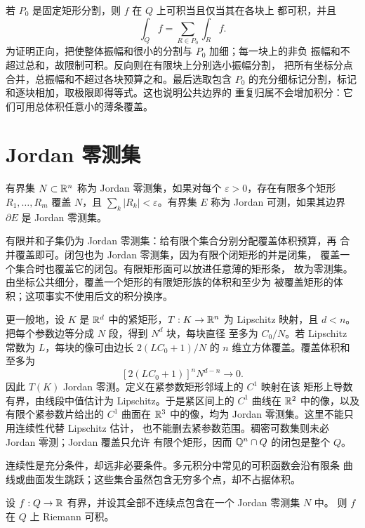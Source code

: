 若 $P_0$ 是固定矩形分割，则 $f$ 在 $Q$ 上可积当且仅当其在各块上
都可积，并且
\[
 \int_Q f=\sum_{R\in P_0}\int_R f.
\]
为证明正向，把使整体振幅和很小的分割与 $P_0$ 加细；每一块上的非负
振幅和不超过总和，故限制可积。反向则在有限块上分别选小振幅分割，
把所有坐标分点合并，总振幅和不超过各块预算之和。最后选取包含 $P_0$
的充分细标记分割，标记和逐块相加，取极限即得等式。这也说明公共边界的
重复归属不会增加积分：它们可用总体积任意小的薄条覆盖。

\section{Jordan 零测集}

\begin{definition}
有界集 $N\subset\mathbb{R}^n$ 称为 Jordan 零测集，如果对每个
$\varepsilon>0$，存在有限多个矩形 $R_1,\ldots,R_m$ 覆盖 $N$，且
$\sum_k|R_k|<\varepsilon$。有界集 $E$ 称为 Jordan 可测，如果其边界
$\partial E$ 是 Jordan 零测集。
\end{definition}

有限并和子集仍为 Jordan 零测集：给有限个集合分别分配覆盖体积预算，再
合并覆盖即可。闭包也为 Jordan 零测集，因为有限个闭矩形的并是闭集，
覆盖一个集合时也覆盖它的闭包。有限矩形面可以放进任意薄的矩形条，
故为零测集。由坐标公共细分，覆盖一个矩形的有限矩形族的体积和至少为
被覆盖矩形的体积；这项事实不使用后文的积分换序。

更一般地，设 $K$ 是 $\mathbb{R}^d$ 中的紧矩形，$T:K\to\mathbb{R}^n$ 为 Lipschitz
映射，且 $d<n$。把每个参数边等分成 $N$ 段，得到 $N^d$ 块，每块直径
至多为 $C_0/N$。若 Lipschitz 常数为 $L$，每块的像可由边长
$2(LC_0+1)/N$ 的 $n$ 维立方体覆盖。覆盖体积和至多为
\[
 [2(LC_0+1)]^n N^{d-n}\longrightarrow0.
\]
因此 $T(K)$ Jordan 零测。定义在紧参数矩形邻域上的 $C^1$ 映射在该
矩形上导数有界，由线段中值估计为 Lipschitz。于是紧区间上的 $C^1$
曲线在 $\mathbb{R}^2$ 中的像，以及有限个紧参数片给出的 $C^1$ 曲面在 $\mathbb{R}^3$
中的像，均为 Jordan 零测集。这里不能只用连续性代替 Lipschitz 估计，
也不能删去紧参数范围。稠密可数集则未必 Jordan 零测；Jordan 覆盖只允许
有限个矩形，因而 $\mathbb{Q}^n\cap Q$ 的闭包是整个 $Q$。

连续性是充分条件，却远非必要条件。多元积分中常见的可积函数会沿有限条
曲线或曲面发生跳跃；这些集合虽然包含无穷多个点，却不占据体积。

\begin{theorem}
\label{thm:jordan-null-discontinuities-integrable}
设 $f:Q\to\mathbb{R}$ 有界，并设其全部不连续点包含在一个 Jordan 零测集 $N$ 中。
则 $f$ 在 $Q$ 上 Riemann 可积。
\end{theorem}

